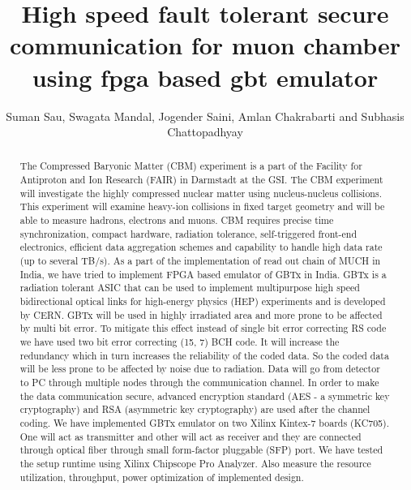\documentclass[a4paper]{jpconf}
\begin{document}
\title{High speed fault tolerant secure communication for muon
chamber using fpga based gbt emulator}

\author[1]{Suman Sau, Swagata Mandal, Jogender Saini, Amlan Chakrabarti and Subhasis Chattopadhyay}
\address{A.K Choudhury School of IT, University of Calcutta Variable Energy Cyclotron Centre, Kolkata, India}

\vspace{-1 pc}
\begin{abstract}
The Compressed Baryonic Matter (CBM) experiment is a part of the Facility for Antiproton and Ion Research (FAIR) in Darmstadt at the GSI. The CBM experiment will investigate the highly compressed nuclear matter using nucleus-nucleus collisions. This experiment will examine heavy-ion collisions in fixed target geometry and will be able to measure hadrons, electrons and muons. CBM requires precise time synchronization, compact hardware, radiation tolerance, self-triggered front-end electronics, efficient data aggregation schemes and capability to handle high data rate (up to several TB/s). 
As a part of the implementation of read out chain of MUCH in India, we have tried to implement FPGA based emulator of GBTx in India. GBTx is a radiation tolerant ASIC that can be used to implement multipurpose high speed bidirectional optical links for high-energy physics (HEP) experiments and is developed by CERN. 
GBTx will be used in highly irradiated area and more prone to be  affected by multi bit error. To mitigate this effect instead of single bit error correcting RS code we have used two bit error correcting (15, 7) BCH code. It will increase the redundancy which in turn increases the reliability of the coded data. So the coded data will be less prone to be affected by noise due to radiation. Data will go from detector to PC through multiple nodes through the communication channel. In order to make the data communication secure, advanced encryption standard (AES - a symmetric key cryptography) and RSA (asymmetric key cryptography) are used after the channel coding. We have implemented GBTx emulator on two Xilinx Kintex-7 boards (KC705). One will act as transmitter and other will act as receiver and they are connected through optical fiber through small form-factor pluggable (SFP) port. We have tested the setup runtime using Xilinx Chipscope Pro Analyzer. Also measure the resource utilization, throughput, power optimization of implemented design. 
\end{abstract}
\vspace{-3 pc}
\end{document}
